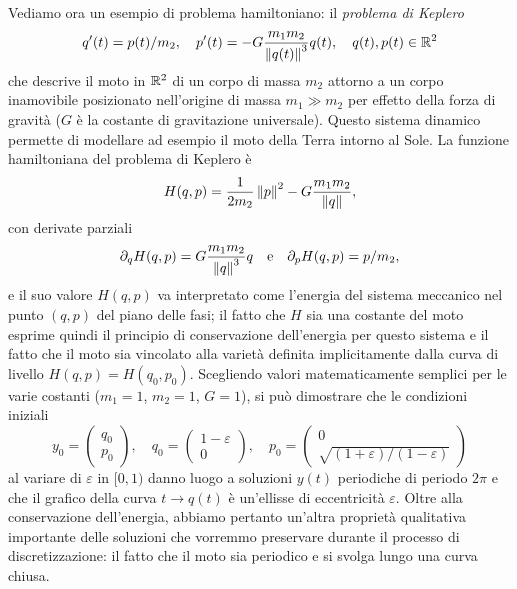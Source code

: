 Vediamo ora un esempio di problema hamiltoniano: il
\emph{problema di Keplero}
\[
q'(t) = p(t)/m_2,
\quad p'(t) = -G \frac{m_1 m_2}{\left\lVert q(t)\right\rVert^3} q(t),
\quad q(t), p(t) \in \mathbb{R}^2
\]
che descrive il moto in $\mathbb{R}^2$ di un corpo di massa $m_2$ attorno
a un corpo inamovibile posizionato nell'origine di massa $m_1 \gg m_2$
per effetto della forza di gravità ($G$ è la costante di gravitazione universale).
Questo sistema dinamico permette di modellare ad esempio il moto della Terra
intorno al Sole. La funzione hamiltoniana del problema di Keplero è
\[
H(q,p) = \frac{1}{2m_2} \left\lVert p\right\rVert^2 - G \frac{m_1 m_2}{\left\lVert q\right\rVert},
\]
con derivate parziali
\[
\partial_q H(q,p) = G \frac{m_1 m_2}{\left\lVert q\right\rVert^3} q
\quad \text{e} \quad
\partial_p H(q,p) = p/m_2,
\]
e il suo valore $H(q,p)$ va interpretato come l'energia del sistema meccanico nel punto
$(q,p)$ del piano delle fasi; il fatto che $H$ sia una costante del moto
esprime quindi il principio di conservazione dell'energia per questo sistema
e il fatto che il moto sia vincolato alla varietà definita implicitamente
dalla curva di livello $H(q,p) = H(q_0,p_0)$.
Scegliendo valori matematicamente semplici per le varie costanti
($m_1 = 1$, $m_2=1$, $G = 1$), si può dimostrare che le condizioni iniziali
\[
y_0 = \begin{pmatrix}
q_0 \\ 
p_0
\end{pmatrix}, \quad
q_0 = \begin{pmatrix}
1-\varepsilon \\ 
0
\end{pmatrix}, \quad
p_0 = \begin{pmatrix}
0 \\ 
\sqrt{(1+\varepsilon)/(1-\varepsilon)}
\end{pmatrix}
\]
al variare di $\varepsilon$ in $[0,1)$ danno luogo a soluzioni $y(t)$ periodiche
di periodo $2\pi$ e che il grafico della curva $t \to q(t)$ è un'ellisse
di eccentricità $\varepsilon$. Oltre alla conservazione dell'energia,
abbiamo pertanto un'altra proprietà qualitativa importante delle soluzioni
che vorremmo preservare durante il processo di discretizzazione: il fatto che
il moto sia periodico e si svolga lungo una curva chiusa.

